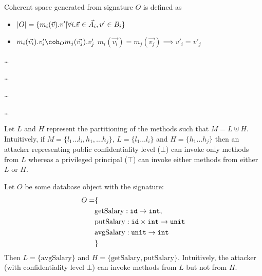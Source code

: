 \documentclass[acmsmall,screen,review, nonacm]{acmart}
\begin{document}
\begin{definition}
  Coherent space generated from signature $O$ is defined as
  \begin{itemize}
  \item $|O| = \{ m_i(\vec{v}).v' | \forall i. \vec{v} \in \vec{A_i}, v' \in B_i  \}$
    \item $ m_i(\vec{v_i}).v'_i \coherent{O} m_j(\vec{v_j}).v'_j$ \isdef $m_i(\vec{v_i}) = m_j(\vec{v_j}) \implies v'_i = v'_j $
  \end{itemize}
  
\end{definition}


\begin{definition}
\dots
\end{definition}

\begin{definition}
\dots

\end{definition}


\begin{definition}[Trace]
\dots

\end{definition}


\begin{definition}[Projection]
\dots

\end{definition}


Let $L$ and $H$ represent the partitioning of the methods such that $M = L \uplus H$. Intuitively, if $M = \{ l_1 \dots l_i, h_1, \dots h_j \}$,  $L = \{ l_1 \dots l_i\}$ and $H = \{ h_1 \dots h_j \}$ then an attacker representing public confidentiality level ($\bot$) can  invoke only methods from $L$ whereas a privileged principal ($\top$) can invoke either methods from either $L$ or $H$. 

\begin{example} \label{ex1}
  Let $O$ be some database object with the signature:
  \begin{align*}
    O = & \{ \\
    & \text{getSalary}: \texttt{id} \to \texttt{int}, \\
    & \text{putSalary}: \texttt{id} \times \texttt{int} \to \texttt{unit} \\
    & \text{avgSalary}: \texttt{unit} \to \texttt{int} \\
    & \}
  \end{align*}
  Then $L = \{ \text{avgSalary} \}$ and $H = \{\text{getSalary}, \text{putSalary} \}$. Intuitively, the  attacker (with confidentiality level $\bot$) can  invoke  methods from $L$ but not from $H$.
  \end{example}
\end{document}
